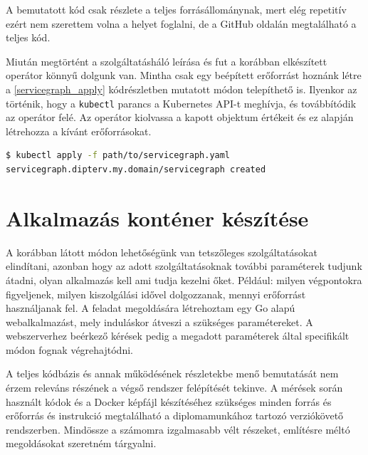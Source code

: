A bemutatott kód csak részlete a teljes forrásállománynak, mert elég repetitív ezért nem szerettem volna a helyet foglalni, de a GitHub oldalán megtalálható a teljes kód. \\

\lstset{caption=Saját szolgáltatásháló definiálása, label=servicegraph_example}


Miután megtörtént a szolgáltatásháló leírása és fut a korábban elkészített operátor könnyű dolgunk van. Mintha csak egy beépített erőforrást hoznánk létre a \ref{servicegraph_apply} kódrészletben mutatott módon telepíthető is. 
Ilyenkor az történik, hogy a \verb+kubectl+ parancs a Kubernetes API-t meghívja, és továbbítódik az operátor felé. Az operátor kiolvassa a kapott objektum értékeit és ez alapján létrehozza a kívánt erőforrásokat. 

\lstset{caption=Szolgáltatásháló indítása, label=servicegraph_apply}
\begin{lstlisting}[language=bash,morekeywords={kubectl, apply},alsoletter={-},breaklines=true]
$ kubectl apply -f path/to/servicegraph.yaml                          
servicegraph.dipterv.my.domain/servicegraph created 
\end{lstlisting}


\section{Alkalmazás konténer készítése}
A korábban látott módon lehetőségünk van tetszőleges szolgáltatásokat elindítani, azonban hogy az adott szolgáltatásoknak további paraméterek tudjunk átadni, olyan alkalmazás kell ami tudja kezelni őket. Például: milyen végpontokra figyeljenek, milyen kiszolgálási idővel dolgozzanak, mennyi erőforrást használjanak fel.
A feladat megoldására létrehoztam egy Go alapú webalkalmazást, mely induláskor átveszi a szükséges paramétereket. A webszerverhez beérkező kérések pedig a megadott paraméterek által specifikált módon fognak végrehajtódni. 

A teljes kódbázis és annak működésének részletekbe menő bemutatását nem érzem releváns részének a végső rendszer felépítését tekinve. 
A mérések során használt kódok és a Docker képfájl készítéséhez szükséges minden forrás és erőforrás és instrukció megtalálható a diplomamunkához tartozó verziókövető rendszerben\citep{gitRepo}. 
Mindössze a számomra izgalmasabb vélt részeket, említésre méltó megoldásokat szeretném tárgyalni.

